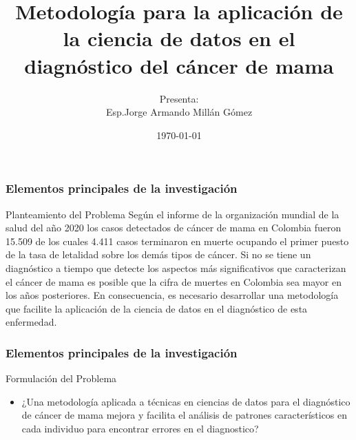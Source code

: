 \documentclass[xcolor=dvipsnames,xcolor=table]{beamer} %
\title[Diagnóstico del cáncer de mama]{Metodología para la aplicación de la ciencia de datos en el diagnóstico del cáncer de mama}
\author[Jorge M., Edith A.]{Presenta:\\ Esp.Jorge Armando Millán Gómez}
\institute[Universidad Distrital]{Universidad Distrital ``Francisco José de Caldas''\\Maestria en ciencias de la información y las comunicaciones}
\date{\today}
\begin{document}
\begin{frame}
	\titlepage
\end{frame}
\begin{frame}
	\frametitle{Elementos principales de la investigación}
	\begin{block}{Planteamiento del Problema}\justifying
	Según el informe de la organización mundial de la salud del año 2020 los casos detectados de cáncer de mama en Colombia fueron 15.509 de los cuales 4.411 casos terminaron en muerte ocupando el primer puesto de la tasa de letalidad sobre los demás tipos de cáncer\cite{InternationalAgencyforResearchonCancer2020}. Si no se tiene un diagnóstico a tiempo que detecte los aspectos más significativos que caracterizan el cáncer de mama es posible que la cifra de muertes en Colombia sea mayor en los años posteriores. En consecuencia, es necesario desarrollar una metodología que facilite la aplicación de la ciencia de datos en el diagnóstico de esta enfermedad.
	\end{block}
\end{frame}

\begin{frame}
	\frametitle{Elementos principales de la investigación}
	\begin{block}{Formulación del Problema}\justifying
		\begin{itemize}
		 	\item ¿Una metodología aplicada a técnicas en ciencias de datos para el diagnóstico de cáncer de mama mejora y facilita el análisis de patrones característicos en cada individuo para encontrar errores en el diagnostico? 
		\end{itemize}
	\end{block}
\end{frame}
\end{document}

